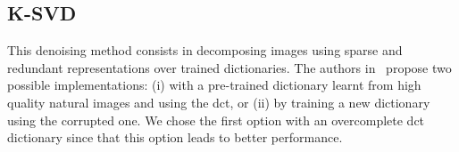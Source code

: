 





\subsection{K-SVD} \label{sc:description-ksvd}
This denoising method consists in decomposing images using sparse and redundant representations over trained dictionaries.
The authors in~\cite{ksvd} propose two possible implementations: (i) with a pre-trained dictionary learnt from high quality natural images and using the \ac{dct}, or (ii) by training a new dictionary using the corrupted one.
We chose the first option with an overcomplete \ac{dct} dictionary since that this option leads to better performance.

